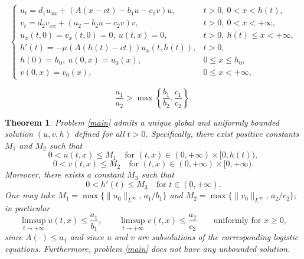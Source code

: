 \documentclass[10pt,a4paper]{amsart}
\newtheorem{theorem}{Theorem}
\newcommand{\rev}[1]{#1}
\begin{document}
	\begin{equation}\label{main}
		\begin{cases}
			u_t = d_1u_{xx} + (A(x - ct) - b_1u - c_1 v) u, & t > 0,~ 0 < x < h(t), \\
			v_t = d_2v_{xx} + (a_2 - b_2u - c_2v)v,          & t > 0,~ 0 < x < +\infty, \\
			u_x(t, 0) = v_x(t, 0) = 0, ~ u(t, x) = 0,        & t > 0, ~ h(t) \leq x < +\infty, \\
			h'(t) = -\mu (A(h(t) - ct))u_x(t, h(t)),          & t > 0, \\
			h(0)=h_0,~ u(0, x) = u_0(x),                       & 0 \leq x \leq h_0, \\
			v(0, x) = v_0(x),                                  & 0 \le x < +\infty,
		\end{cases}
	\end{equation}

	\begin{equation}\label{superior}
		\frac{a_1}{a_2} > \max\left\{\frac{b_1}{b_2}, \frac{c_1}{c_2}\right\}.
	\end{equation}

	\begin{theorem}\label{th:bounds}
		Problem \eqref{main} admits a unique global and uniformly bounded solution $(u,v,h)$ defined for all $t > 0$. Specifically, there exist positive constants $M_1$ and $M_2$ such that
		\[
		0 < u(t,x) \leq M_1
		\quad\text{for }(t, x) \in (0, +\infty) \times [0, h(t)),
		\]
		\[
		0 < v(t,x) \leq M_2
		\quad\text{for }(t, x) \in (0, +\infty) \times [0, +\infty).
		\]
		Moreover, there exists a constant $M_3$ such that
		\[
		0 < h'(t) \leq M_3 \quad\text{for } t \in (0,+\infty).
		\]
		\rev{One may take $M_1=\max\{\|u_0\|_{L^\infty},\,a_1/b_1\}$ and
		$M_2=\max\{\|v_0\|_{L^\infty},\,a_2/c_2\}$; in particular
		\[
		\limsup_{t\to+\infty}u(t,x)\le \frac{a_1}{b_1},\qquad
		\limsup_{t\to+\infty}v(t,x)\le \frac{a_2}{c_2}
		\qquad\text{uniformly for }x\ge0,
		\]
		since $A(\cdot)\le a_1$ and since $u$ and $v$ are subsolutions of the
		corresponding logistic equations.}
		Furthermore, problem \eqref{main} does not have any unbounded solution.
	\end{theorem}
\end{document}
